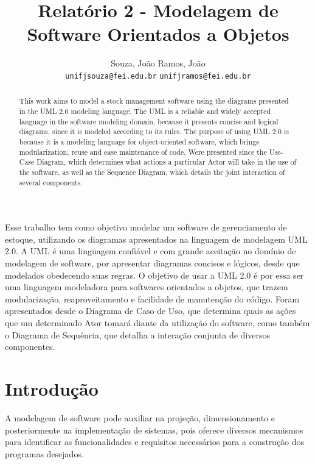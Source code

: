 \documentclass[rascunho,xindy,acronym,symbols]{fei}
\author{
  Souza, João \qquad \qquad \qquad \qquad \quad Ramos, João\\
  \texttt{unifjsouza@fei.edu.br} \qquad
  \texttt{unifjramos@fei.edu.br}
}
\title{Relatório 2 - Modelagem de Software Orientados a Objetos}
\begin{document}
\maketitle


\begin{resumo}

Esse trabalho tem como objetivo modelar um software de gerenciamento de estoque, utilizando os diagramas apresentados na linguagem de modelagem UML 2.0. A UML é uma linguagem confiável e com grande aceitação no domínio de modelagem de software, por apresentar diagramas concisos e lógicos, desde que modelados obedecendo suas regras. O objetivo de usar a UML 2.0 é por essa ser uma linguagem modeladora para softwares orientados a objetos, que trazem modularização, reaproveitamento e facilidade de manutenção do código. Foram apresentados desde o Diagrama de Caso de Uso, que determina quais as ações que um determinado Ator tomará diante da utilização do software, como também o Diagrama de Sequência, que detalha a interação conjunta de diversos componentes.


\end{resumo}

\begin{abstract}
This work aims to model a stock management software using the diagrams presented in the UML 2.0 modeling language. The UML is a reliable and widely accepted language in the software modeling domain, because it presents concise and logical diagrams, since it is modeled according to its rules. The purpose of using UML 2.0 is because it is a modeling language for object-oriented software, which brings modularization, reuse and ease maintenance of code. Were presented since the Use-Case Diagram, which determines what actions a particular Actor will take in the use of the software, as well as the Sequence Diagram, which details the joint interaction of several components.
\end{abstract}

\listoffigures
\tableofcontents

\chapter{Introdução}

A modelagem de software pode auxiliar na projeção, dimensionamento e posteriormente na implementação de sistemas, pois oferece diversos mecanismos para identificar as funcionalidades e requisitos necessários para a construção dos programas desejados.
\end{document}
